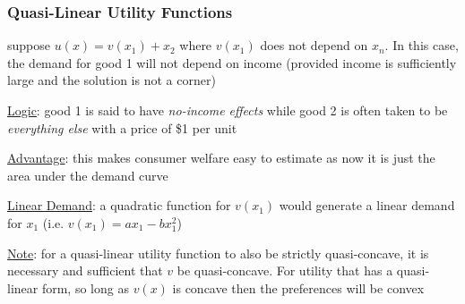\documentclass{article}
\begin{document}
\subsubsection{Quasi-Linear Utility Functions}
 suppose $u(x) = v(x_{1}) + x_{2}$ where $v(x_{1})$ does not depend on $x_{n}$. In this case, the demand for good 1 will not depend on income (provided income is sufficiently large and the solution is not a corner) \par \vspace{0.3em}
  \underline{Logic}: good 1 is said to have \textit{no-income effects} while good 2 is often taken to be \textit{everything else} with a price of \$1 per unit
  \par
  \underline{Advantage}: this makes consumer welfare easy to estimate as now it is just the area under the demand curve
  \par
  \underline{Linear Demand}: a quadratic function for $v(x_{1})$ would generate a linear demand for $x_{1}$ (i.e. $v(x_{1}) = ax_{1} - bx_{1}^{2}$)
  \par
  \underline{Note}: for a quasi-linear utility function to also be strictly quasi-concave, it is necessary and sufficient that $v$ be quasi-concave. For utility that has a quasi-linear form, so long as $v(x)$ is concave then the preferences will be convex
  \par
\vspace{6mm}
\end{document}

